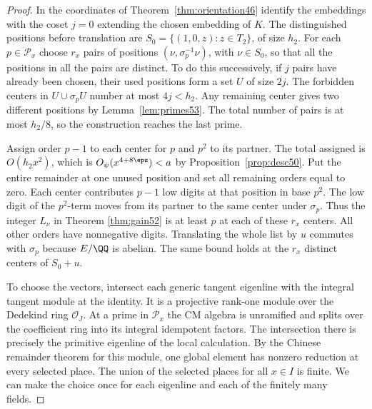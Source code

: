 \documentclass[a4paper,11pt]{article}
\theoremstyle{definition}
\theoremstyle{remark}
\numberwithin{equation}{section}
\begin{document}
\begin{proof}
In the coordinates of Theorem~\ref{thm:orientation46} identify the
embeddings with the coset \(j=0\) extending the chosen embedding of
\(K\). The distinguished positions before translation are
\(S_0=\{(1,0,z):z\in T_2\}\), of size \(h_2\).
For each \(p\in\mathcal P_x\) choose \(r_x\) pairs of positions
\((\nu,\sigma_p^{-1}\nu)\), with \(\nu\in S_0\), so that all the
positions in all the pairs are distinct. To do this successively,
if \(j\) pairs have already been chosen, their used positions form a
set \(U\) of size \(2j\). The forbidden centers in
\(U\cup\sigma_p U\) number at most \(4j<h_2\). Any remaining
center gives two different positions by Lemma~\ref{lem:primes53}.
The total number of pairs is at most \(h_2/8\), so the construction
reaches the last prime.

Assign order \(p-1\) to each center for \(p\) and \(p^2\) to its
partner. The total assigned is \(O(h_2x^2)\), which is
\(O_\psi(x^{4+8\eps})<a\) by Proposition~\ref{prop:desc50}.
Put the entire remainder at one unused position and set all
remaining orders equal to zero. Each center contributes \(p-1\)
low digits at that position in base \(p^2\). The low digit of
the \(p^2\)-term moves from its partner to the same center under
\(\sigma_p\). Thus the integer \(L_\nu\) in
Theorem \ref{thm:gain52}
is at least \(p\) at each of these \(r_x\) centers. All other orders
have nonnegative digits. Translating the whole list by \(u\)
commutes with \(\sigma_p\) because \(E/\QQ\) is abelian. The same
bound holds at the \(r_x\) distinct centers of \(S_0+u\).

To choose the vectors, intersect each generic tangent eigenline
with the integral tangent module at the identity. It is a projective
rank-one module over the Dedekind ring \(\mathcal O_J\). At a prime
in \(\mathcal P_x\) the CM algebra is unramified and splits over the
coefficient ring into its integral idempotent factors. The intersection
there is precisely the primitive eigenline of the local calculation.
By the Chinese remainder theorem for this module, one global element
has nonzero reduction at every selected place. The union of the
selected places for all \(x\in I\) is finite. We can make the
choice once for each eigenline and each of the finitely many fields.


\end{proof}
\end{document}
